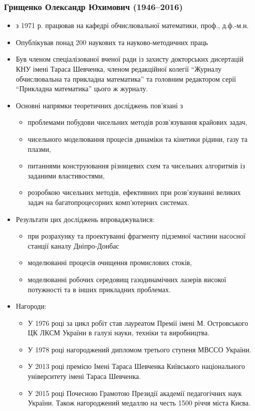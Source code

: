 \subsubsection{Грищенко Олександр Юхимович (1946--2016)}
\begin{itemize}
    \item з 1971 р. працював на кафедрі обчислювальної математики, проф., д.ф.-м.н.
    \item Опублікував понад 200 наукових та науково-методичних праць 
    \item Був членом спеціалізованої вченої ради із захисту докторських дисертацій КНУ імені Тараса Шевченка,  членом редакційної колегії ``Журналу обчислювальна та прикладна математика'' та головним редактором серії ``Прикладна математика'' цього ж журналу.
    \item Основні напрямки теоретичних досліджень пов'язані з 
    \begin{itemize}
        \item проблемами  побудови чисельних методів розв'язування крайових задач, 
        \item чисельного моделювання процесів динаміки та кінетики рідини, газу та плазми, 
        \item питаннями конструювання різницевих схем та чисельних алгоритмів із заданими властивостями, 
        \item розробкою чисельних методів, ефективних при розв'язуванні великих задач на багатопроцесорних комп'ютерних системах.
    \end{itemize}
    \item Результати цих досліджень впроваджувалися:
    \begin{itemize}
        \item при розрахунку та проектуванні фрагменту підземної частини насосної станції каналу Дніпро-Донбас
        \item моделюванні процесів очищення промислових стоків, 
        \item моделюванні робочих середовищ газодинамічних лазерів високої потужності та в інших прикладних проблемах.
    \end{itemize}
    \item Нагороди:
    \begin{itemize}
        \item У 1976 році за цикл робіт став лауреатом Премії імені М. Островського ЦК ЛКСМ України в галузі науки, техніки та виробництва.
        \item У 1978 році нагороджений дипломом третього ступеня МВССО України.
        \item У 2013 році премією Імені Тараса Шевченка Київського національного університету імені Тараса Шевченка.
        \item У 2015 році Почесною Грамотою Президії академії педагогічних наук \allowbreak України. Також нагороджений медаллю на честь 1500 річчя міста Києва.
    \end{itemize}
\end{itemize}
\newpage
